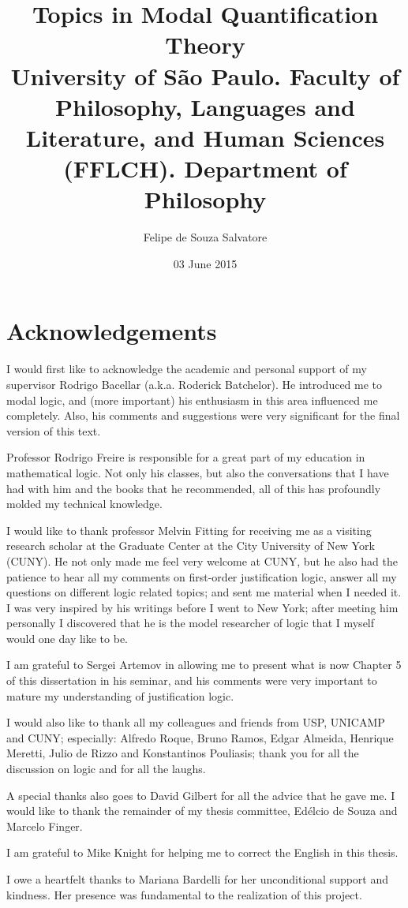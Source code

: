 \documentclass[12pt]{report}
\title{
	{\textbf{Topics in Modal Quantification Theory}}\\
	{\large University of São Paulo. Faculty of Philosophy, Languages and Literature, and Human Sciences (FFLCH). Department of Philosophy}}
\author{Felipe de Souza Salvatore}
\date{03 June 2015}
\theoremstyle{definition}
\begin{document}
\onehalfspacing

\chapter*{Acknowledgements}


\qquad I would first like to acknowledge the academic and personal support of my supervisor Rodrigo Bacellar (a.k.a. Roderick Batchelor). He introduced me to modal logic, and (more important) his enthusiasm in this area influenced me completely. Also, his comments and suggestions were very significant for the final version of this text. 

\qquad Professor Rodrigo Freire is responsible for a great part of my education in mathematical logic. Not only his classes, but also the conversations that I have had with him and the books that he recommended, all of this has profoundly molded my technical knowledge.

\qquad I would like to thank professor Melvin Fitting for receiving me as a visiting research scholar at the Graduate Center at the City University of New York (CUNY). He not only made me feel very welcome at CUNY, but he also had the patience to hear all my comments on first-order justification logic, answer all my questions on different logic related topics; and sent me material when I needed it. I was very inspired by his writings before I went to New York; after meeting him personally I discovered that he is the model researcher of logic that I myself would one day like to be.

\qquad I am grateful to Sergei Artemov in allowing me to present what is now Chapter 5 of this dissertation in his seminar, and his comments were very important to mature my understanding of justification logic. 

\qquad I would also like to thank all my colleagues and friends from USP, UNICAMP and CUNY; especially: Alfredo Roque, Bruno Ramos, Edgar Almeida, Henrique Meretti, Julio de Rizzo and Konstantinos Pouliasis; thank you for all the discussion on logic and for all the laughs.

\qquad A special thanks also goes to David Gilbert for
all the advice that he gave me. I would like to thank the remainder of my thesis committee, Ed\'elcio de Souza and Marcelo Finger. 

\qquad I am grateful to Mike Knight for helping me to correct the English in this thesis.

\qquad I owe a heartfelt thanks to Mariana Bardelli for her unconditional support and kindness. Her presence was fundamental to the realization of this project. 
\end{document}
